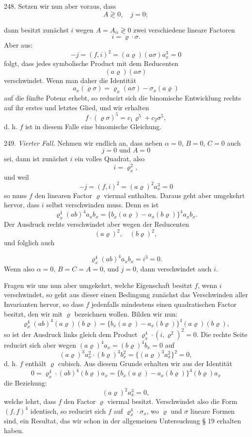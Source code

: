 \documentclass[11pt]{article}
\providecommand{\weberpage}[1]{}
\providecommand{\weq}[2]{\begin{equation}\tag{#1}#2\end{equation}}
\begin{document}
248. Setzen wir nun aber voraus, dass
\weq{2}{A \gtrless 0,\quad j = 0;}


\weberpage{274}
dann besitzt zunächst $i$ wegen $A = A_{ii} \gtrless 0$ zwei verschiedene
lineare Factoren
\[
i = \varrho \cdot \sigma .
\]
Aber aus:
\[
-j = (f,i)^2 = (a\varrho)(a\sigma)a_x^3 = 0
\]
folgt, dass jedes symbolische Product mit dem Reducenten
\[
(a\varrho)(a\sigma)
\]
verschwindet. Wenn man daher die Identität
\[
a_x(\varrho\sigma) = \varrho_x(a\sigma) - \sigma_x(a\varrho)
\]
auf die fünfte Potenz erhebt, so reducirt sich die binomische Entwicklung
rechts auf ihr erstes und letztes Glied, und wir erhalten
\[
f\cdot(\varrho\sigma)^5 = c_1\varrho^5 + c_2\sigma^5,
\]
d. h. $f$ ist in diesem Falle eine binomische Gleichung.

249. \textit{Vierter Fall.} Nehmen wir endlich an, dass neben $\alpha = 0$,
$B = 0$, $C = 0$ auch
\weq{3}{j = 0 \text{ und } A = 0}
sei, dann ist zunächst $i$ ein volles Quadrat, also
\[
i = \varrho_x^2,
\]
und weil
\[
-j = (f,i)^2 = (a\varrho)^2 a_x^3 = 0
\]
so muss $f$ den linearen Factor $\varrho$ viermal enthalten. Daraus geht
aber umgekehrt hervor, dass $i$ selbst verschwinden muss. Denn es ist
\weq{1}{\varrho_x^4(ab)^4 a_x b_x = \{b_x(a\varrho) - a_x(b\varrho)\}^4 a_x b_x .}
Der Ausdruck rechts verschwindet aber wegen der Reducenten
\[
(a\varrho)^2,\quad (b\varrho)^2,
\]
und folglich auch


\weberpage{275}
\[
\varrho_x^4(ab)^4 a_x b_x = i^3 = 0.
\]
Wenn also $\alpha = 0$, $B = C = A = 0$, und $j = 0$, dann verschwindet auch $i$.

Fragen wir uns nun aber umgekehrt, welche Eigenschaft besitzt $f$, wenn $i$
verschwindet, so geht aus dieser einen Bedingung zunächst das Verschwinden
aller Invarianten hervor, so dass $f$ jedenfalls mindestens einen
quadratischen Factor besitzt, den wir mit $\varrho$ bezeichnen wollen.
Bilden wir nun:
\weq{2}{\varrho_x^4(ab)^4(a\varrho)(b\varrho) = \{b_x(a\varrho) - a_x(b\varrho)\}^4(a\varrho)(b\varrho),}
so ist der Ausdruck links gleich dem Product $\varrho_x^4\cdot(i,\varrho^2)^2 = 0$.
Die rechte Seite reducirt sich aber wegen $(a\varrho)^4 a_x = (b\varrho)^4 b_x = 0$ auf
\weq{3}{(a\varrho)^3 a_x^2 \cdot (b\varrho)^3 b_x^2 = \{(a\varrho)^3 a_x^2\}^2 = 0,}
d. h. $f$ enthält $\varrho$ cubisch. Aus diesem Grunde erhalten wir aus der
Identität
\[
0 = \varrho_x^4\cdot(ab)^4(b\varrho)a_x = \{b_x(a\varrho) - a_x(b\varrho)\}^4(b\varrho)a_x
\]
die Beziehung:
\weq{4}{(a\varrho)^2 a_x^3 = 0,}
welche lehrt, dass $f$ den Factor $\varrho$ viermal besitzt. Verschwindet
also die Form $(f,f)^4$ identisch, so reducirt sich $f$ auf
$\varrho_x^4\cdot\sigma_x$, wo $\varrho$ und $\sigma$ lineare Formen sind,
ein Resultat, das wir schon in der allgemeinen Untersuchung § 19 erhalten
haben.
\end{document}
